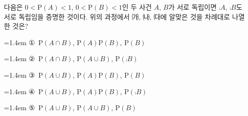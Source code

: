 다음은 $0<\mathrm{P}(A)<1$, $0<\mathrm{P}(B)<1$인 두 사건 $A$, $B$가 서로 독립이면 $\comp{A}$, $\comp{B}$도 서로 독립임을 증명한 것이다. \noindent 위의 과정에서 ㈎, ㈏, ㈐에 알맞은 것을 차례대로 나열한 것은?
\par\medskip\par\noindent\hangindent=1.4em {\small ①}\ $\mathrm{P}(A\cap B)$, $\mathrm{P}(A)\mathrm{P}(B)$, $\mathrm{P}(B)$\par\noindent\hangindent=1.4em {\small ②}\ $\mathrm{P}(A\cap B)$, $\mathrm{P}(A\cup B)$, $\mathrm{P}(\comp{B})$\par\noindent\hangindent=1.4em {\small ③}\ $\mathrm{P}(A\cup B)$, $\mathrm{P}(A)\mathrm{P}(B)$, $\mathrm{P}(B)$\par\noindent\hangindent=1.4em {\small ④}\ $\mathrm{P}(A\cup B)$, $\mathrm{P}(A)\mathrm{P}(B)$, $\mathrm{P}(\comp{B})$\par\noindent\hangindent=1.4em {\small ⑤}\ $\mathrm{P}(A\cup B)$, $\mathrm{P}(A\cup B)$, $\mathrm{P}(B)$\par\medskip

